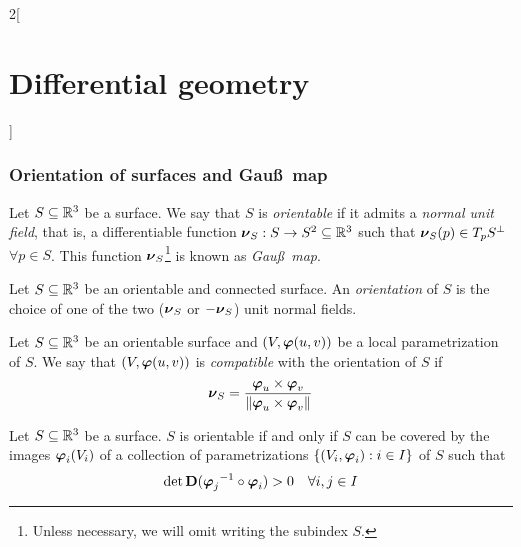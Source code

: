 \documentclass[../../../main.tex]{subfiles}
\begin{document}
\begin{multicols}{2}[\section{Differential geometry}]
  \subsubsection{Orientation of surfaces and Gau\ss\ map}
  \begin{definition}
    Let $S\subseteq\mathbb{R}^3$ be a surface. We say that $S$ is \emph{orientable} if it admits a \emph{normal unit field}, that is, a differentiable function $\boldsymbol{\mathrm{\nu}}_S:S\rightarrow S^2\subseteq\mathbb{R}^3$ such that $\boldsymbol{\mathrm{\nu}}_S(p)\in T_pS^\perp$ $\forall p\in S$. This function $\boldsymbol{\mathrm{\nu}}_S$\footnote{Unless necessary, we will omit writing the subindex $S$.} is known as \emph{Gau\ss\ map}.
  \end{definition}
  \begin{definition}
    Let $S\subseteq\mathbb{R}^3$ be an orientable and connected surface. An \emph{orientation} of $S$ is the choice of one of the two ($\boldsymbol{\mathrm{\nu}}_S$ or $-\boldsymbol{\mathrm{\nu}}_S$) unit normal fields.
  \end{definition}
  \begin{definition}
    Let $S\subseteq\mathbb{R}^3$ be an orientable surface and $(V,\boldsymbol{\mathrm{\varphi}}(u,v))$ be a local parametrization of $S$. We say that $(V,\boldsymbol{\mathrm{\varphi}}(u,v))$ is \emph{compatible} with the orientation of $S$ if $$\boldsymbol{\mathrm{\nu}}_S=\frac{\boldsymbol{\mathrm{\varphi}}_u\times\boldsymbol{\mathrm{\varphi}}_v}{\|\boldsymbol{\mathrm{\varphi}}_u\times\boldsymbol{\mathrm{\varphi}}_v\|}$$
  \end{definition}
  \begin{proposition}
    Let $S\subseteq\mathbb{R}^3$ be a surface. $S$ is orientable if and only if $S$ can be covered by the images $\boldsymbol{\mathrm{\varphi}}_i(V_i)$ of a collection of parametrizations $\{(V_i,\boldsymbol{\mathrm{\varphi}}_i):i\in I\}$ of $S$ such that $$\det\boldsymbol{\mathrm{D}}({\boldsymbol{\mathrm{\varphi}}_j}^{-1}\circ\boldsymbol{\mathrm{\varphi}}_i)>0\quad\forall i,j\in I$$
  \end{proposition}

\end{multicols}
\end{document}
